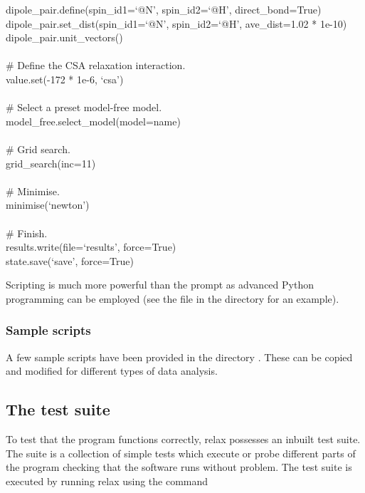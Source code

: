 \begin{exampleenv}
dipole\_pair.define(spin\_id1=`@N', spin\_id2=`@H', direct\_bond=True) \\
dipole\_pair.set\_dist(spin\_id1=`@N', spin\_id2=`@H', ave\_dist=1.02 * 1e-10) \\
dipole\_pair.unit\_vectors() \\
 \\
\# Define the CSA relaxation interaction. \\
value.set(-172 * 1e-6, `csa') \\
 \\
\# Select a preset model-free model. \\
model\_free.select\_model(model=name) \\
 \\
\# Grid search. \\
grid\_search(inc=11) \\
 \\
\# Minimise. \\
minimise(`newton') \\
 \\
\# Finish. \\
results.write(file=`results', force=True) \\
state.save(`save', force=True)
\end{exampleenv}

Scripting is much more powerful than the prompt as advanced Python programming can be employed (see the file  in the  directory for an example).



\subsubsection{Sample scripts}

A few sample scripts have been provided in the directory .  These can be copied and modified for different types of data analysis.




\subsection{The test suite}

To test that the program functions correctly, relax possesses an inbuilt test suite.  The suite is a collection of simple tests which execute or probe different parts of the program checking that the software runs without problem.  The test suite is executed by running relax using the command

